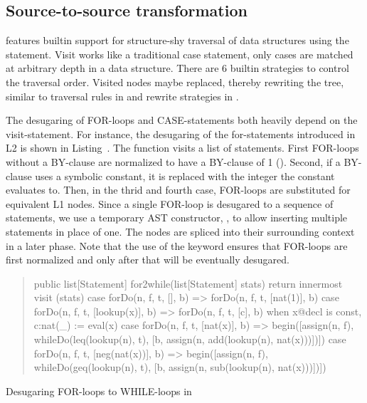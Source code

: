 \subsection{Source-to-source transformation}

\noindent \Rascal features builtin support for structure-shy traversal
of data structures using the  statement. Visit works like
a traditional case statement, only cases are matched at arbitrary
depth in a data structure. There are 6 builtin strategies to control
the traversal order. Visited nodes maybe replaced, thereby rewriting
the tree, similar to traversal rules in \cite{ASF+SDF} and rewrite
strategies in \cite{Stratego}.


The desugaring of FOR-loops and CASE-statements both heavily depend on
the visit-statement. For instance, the desugaring of the
for-statements introduced in L2 is shown in
Listing~\cite{LST:for2while}. The function  visits
a list of statements. First FOR-loops without a BY-clause are
normalized to have a BY-clause of 1 (). Second, if a
BY-clause uses a symbolic constant, it is replaced with the integer
the constant evaluates to. Then, in the thrid and fourth case,
FOR-loops are substituted for equivalent L1 \oberon nodes. Since a
single FOR-loop is desugared to a sequence of statements, we use a
temporary AST constructor, , to allow inserting
multiple statements in place of one. The  nodes are
spliced into their surrounding context in a later phase. Note that the
use of the  keyword ensures that FOR-loops are first
normalized and only after that will be eventually desugared.

\begin{listing}[t]
\begin{quote}
\begin{rascal}
public list[Statement] for2while(list[Statement] stats) {
 return innermost visit (stats) {
  case forDo(n, f, t, [], b) => forDo(n, f, t, [nat(1)], b)
  case forDo(n, f, t, [lookup(x)], b) => forDo(n, f, t, [c], b)
           when x@decl is const, c:nat(_) := eval(x)
  case forDo(n, f, t, [nat(x)], b) => 
           begin([assign(n, f), whileDo(leq(lookup(n), t), 
              [b, assign(n, add(lookup(n), nat(x)))])]) 
  case forDo(n, f, t, [neg(nat(x))], b) => 
           begin([assign(n, f), whileDo(geq(lookup(n), t), 
              [b, assign(n, sub(lookup(n), nat(x)))])]) 
 }
}
\end{rascal}
\end{quote}
\caption{Desugaring \oberon FOR-loops to WHILE-loops in
  \Rascal\label{LST:for2while}} 
\end{listing}

